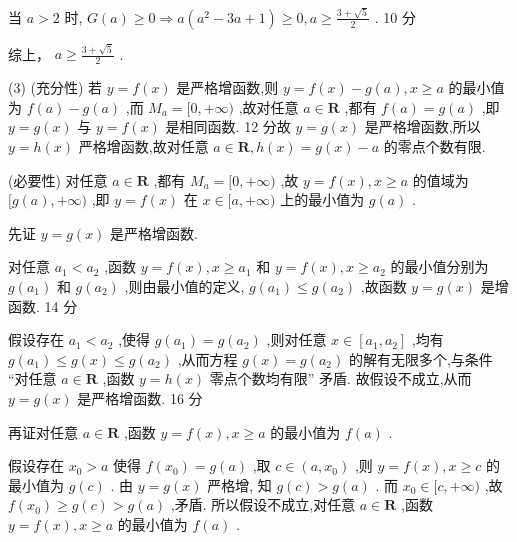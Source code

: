 \documentclass[10pt]{article}
\begin{document}
当 \(a > 2\) 时, \(G\left( a\right)  \geq  0 \Rightarrow  a\left( {{a}^{2} - {3a} + 1}\right)  \geq  0,a \geq  \frac{3 + \sqrt{5}}{2}\) . 10 分

综上， \(a \geq  \frac{3 + \sqrt{5}}{2}\) .

(3) (充分性) 若 \(y = f\left( x\right)\) 是严格增函数,则 \(y = f\left( x\right)  - g\left( a\right) ,x \geq  a\) 的最小值为 \(f\left( a\right)  - g\left( a\right)\) ,而 \({M}_{a} = \lbrack 0, + \infty )\) ,故对任意 \(a \in  \mathbf{R}\) ,都有 \(f\left( a\right)  = g\left( a\right)\) ,即 \(y = g\left( x\right)\) 与 \(y = f\left( x\right)\) 是相同函数. 12 分故 \(y = g\left( x\right)\) 是严格增函数,所以 \(y = h\left( x\right)\) 严格增函数,故对任意 \(a \in  \mathbf{R},h\left( x\right)  = g\left( x\right)  - a\) 的零点个数有限.

(必要性) 对任意 \(a \in  \mathbf{R}\) ,都有 \({M}_{a} = \lbrack 0, + \infty )\) ,故 \(y = f\left( x\right) ,x \geq  a\) 的值域为 \(\lbrack g\left( a\right) , + \infty )\) ,即 \(y = f\left( x\right)\) 在 \(x \in  \lbrack a, + \infty )\) 上的最小值为 \(g\left( a\right)\) .

先证 \(y = g\left( x\right)\) 是严格增函数.

对任意 \({a}_{1} < {a}_{2}\) ,函数 \(y = f\left( x\right) ,x \geq  {a}_{1}\) 和 \(y = f\left( x\right) ,x \geq  {a}_{2}\) 的最小值分别为 \(g\left( {a}_{1}\right)\) 和 \(g\left( {a}_{2}\right)\) ,则由最小值的定义, \(g\left( {a}_{1}\right)  \leq  g\left( {a}_{2}\right)\) ,故函数 \(y = g\left( x\right)\) 是增函数. 14 分

假设存在 \({a}_{1} < {a}_{2}\) ,使得 \(g\left( {a}_{1}\right)  = g\left( {a}_{2}\right)\) ,则对任意 \(x \in  \left\lbrack  {{a}_{1},{a}_{2}}\right\rbrack\) ,均有 \(g\left( {a}_{1}\right)  \leq  g\left( x\right)  \leq  g\left( {a}_{2}\right)\) ,从而方程 \(g\left( x\right)  = g\left( {a}_{2}\right)\) 的解有无限多个,与条件 “对任意 \(a \in  \mathbf{R}\) ,函数 \(y = h\left( x\right)\) 零点个数均有限” 矛盾. 故假设不成立,从而 \(y = g\left( x\right)\) 是严格增函数. 16 分

再证对任意 \(a \in  \mathbf{R}\) ,函数 \(y = f\left( x\right) ,x \geq  a\) 的最小值为 \(f\left( a\right)\) .

假设存在 \({x}_{0} > a\) 使得 \(f\left( {x}_{0}\right)  = g\left( a\right)\) ,取 \(c \in  \left( {a,{x}_{0}}\right)\) ,则 \(y = f\left( x\right) ,x \geq  c\) 的最小值为 \(g\left( c\right)\) . 由 \(y = g\left( x\right)\) 严格增, 知 \(g\left( c\right)  > g\left( a\right)\) . 而 \({x}_{0} \in  \lbrack c, + \infty )\) ,故 \(f\left( {x}_{0}\right)  \geq  g\left( c\right)  > g\left( a\right)\) ,矛盾. 所以假设不成立,对任意 \(a \in  \mathbf{R}\) ,函数 \(y = f\left( x\right) ,x \geq  a\) 的最小值为 \(f\left( a\right)\) .
\end{document}
